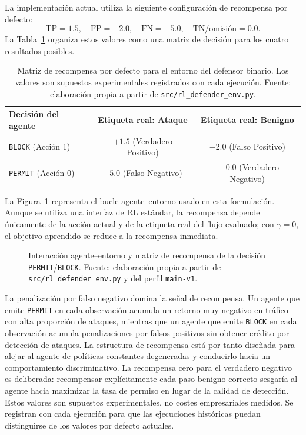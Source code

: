 La implementación actual utiliza la siguiente configuración de recompensa por defecto:
\[
\text{TP}=1.5,\quad \text{FP}=-2.0,\quad \text{FN}=-5.0,\quad \text{TN/omisión}=0.0.
\]
La Tabla~\ref{tab:reward-matrix} organiza estos valores como una matriz de decisión para los cuatro resultados posibles.

\begin{table}[htbp]
\centering
\small
\setlength{\tabcolsep}{4pt}
\begin{tabular}{lcc}
\toprule
Decisión del agente & Etiqueta real: Ataque & Etiqueta real: Benigno \\
\midrule
\texttt{BLOCK} (Acción 1) & $+1.5$ (Verdadero Positivo) & $-2.0$ (Falso Positivo) \\
\texttt{PERMIT} (Acción 0) & $-5.0$ (Falso Negativo) & $\phantom{-}0.0$ (Verdadero Negativo) \\
\bottomrule
\end{tabular}
\caption[Matriz de recompensa del entorno del defensor binario]{Matriz de recompensa por defecto para el entorno del defensor binario. Los valores son supuestos experimentales registrados con cada ejecución. Fuente: elaboración propia a partir de \texttt{src/rl\_defender\_env.py}.}
\label{tab:reward-matrix}
\end{table}

La Figura~\ref{fig:agente-entorno} representa el bucle agente--entorno usado en esta formulación. Aunque se utiliza una interfaz de RL estándar, la recompensa depende únicamente de la acción actual y de la etiqueta real del flujo evaluado; con $\gamma = 0$, el objetivo aprendido se reduce a la recompensa inmediata.

\begin{figure}[htbp]
\centering
\resizebox{0.9\textwidth}{!}{}
\caption[Interacción agente--entorno]{Interacción agente--entorno y matriz de recompensa de la decisión \texttt{PERMIT}/\texttt{BLOCK}. Fuente: elaboración propia a partir de \texttt{src/rl\_defender\_env.py} y del perfil \texttt{main-v1}.}
\label{fig:agente-entorno}
\end{figure}

La penalización por falso negativo domina la señal de recompensa. Un agente que emite \texttt{PERMIT} en cada observación acumula un retorno muy negativo en tráfico con alta proporción de ataques, mientras que un agente que emite \texttt{BLOCK} en cada observación acumula penalizaciones por falsos positivos sin obtener crédito por detección de ataques. La estructura de recompensa está por tanto diseñada para alejar al agente de políticas constantes degeneradas y conducirlo hacia un comportamiento discriminativo. La recompensa cero para el verdadero negativo es deliberada: recompensar explícitamente cada paso benigno correcto sesgaría al agente hacia maximizar la tasa de permiso en lugar de la calidad de detección. Estos valores son supuestos experimentales, no costes empresariales medidos. Se registran con cada ejecución para que las ejecuciones históricas puedan distinguirse de los valores por defecto actuales.

